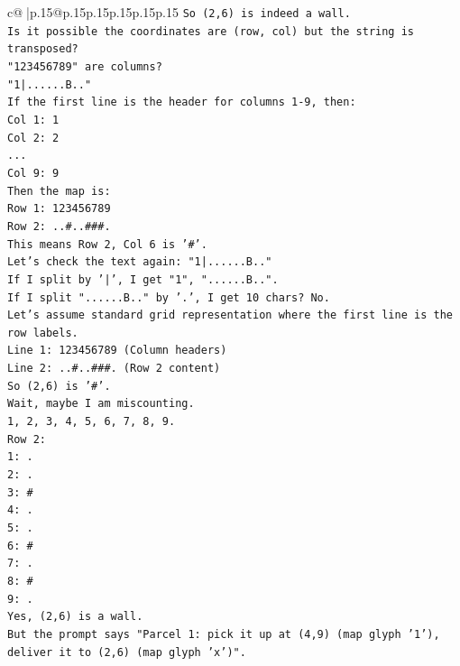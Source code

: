 \documentclass{article}
\begin{document}
{\begin{supertabular}{c@{$\;$}|p{.15\linewidth}@{}p{.15\linewidth}p{.15\linewidth}p{.15\linewidth}p{.15\linewidth}p{.15\linewidth}}
{{{\texttt{So (2,6) is indeed a wall.} \\
\texttt{Is it possible the coordinates are (row, col) but the string is transposed?} \\
\texttt{"123456789" are columns?} \\
\texttt{"1|......B.."} \\
\texttt{If the first line is the header for columns 1{-}9, then:} \\
\texttt{Col 1: 1} \\
\texttt{Col 2: 2} \\
\texttt{...} \\
\texttt{Col 9: 9} \\
\texttt{Then the map is:} \\
\texttt{Row 1: 123456789} \\
\texttt{Row 2: ..\#..\#\#\#.} \\
\texttt{This means Row 2, Col 6 is '\#'.} \\
\texttt{Let's check the text again: "1|......B.."} \\
\texttt{If I split by '|', I get "1", "......B..".} \\
\texttt{If I split "......B.." by '.', I get 10 chars? No.} \\
\texttt{Let's assume standard grid representation where the first line is the row labels.} \\
\texttt{Line 1: 123456789 (Column headers)} \\
\texttt{Line 2: ..\#..\#\#\#. (Row 2 content)} \\
\texttt{So (2,6) is '\#'.} \\
\texttt{Wait, maybe I am miscounting.} \\
\texttt{1, 2, 3, 4, 5, 6, 7, 8, 9.} \\
\texttt{Row 2:} \\
\texttt{1: .} \\
\texttt{2: .} \\
\texttt{3: \#} \\
\texttt{4: .} \\
\texttt{5: .} \\
\texttt{6: \#} \\
\texttt{7: .} \\
\texttt{8: \#} \\
\texttt{9: .} \\
\texttt{Yes, (2,6) is a wall.} \\
\texttt{But the prompt says "Parcel 1: pick it up at (4,9) (map glyph '1'), deliver it to (2,6) (map glyph 'x')".} \\
}}}
\end{supertabular}}
\end{document}
